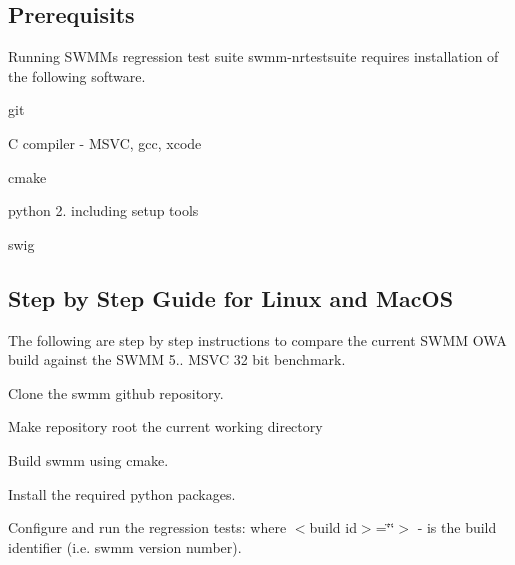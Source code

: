 \subsection*{Prerequisits}

Running S\+W\+MM\textquotesingle{}s regression test suite {\ttfamily swmm-\/nrtestsuite} requires installation of the following software.
\begin{DoxyItemize}
\item git
\item C compiler -\/ M\+S\+VC, gcc, xcode
\item cmake
\item python 2. including setup tools
\item swig
\end{DoxyItemize}

\subsection*{Step by Step Guide for Linux and Mac\+OS}

The following are step by step instructions to compare the current S\+W\+MM O\+WA build against the S\+W\+MM 5.. M\+S\+VC 32 bit benchmark.


\begin{DoxyEnumerate}
\item Clone the swmm github repository. 
\begin{DoxyCode}{0}
\end{DoxyCode}

\item Make repository root the current working directory 
\begin{DoxyCode}{0}
\end{DoxyCode}

\item Build swmm using cmake. 
\begin{DoxyCode}{0}
\end{DoxyCode}

\item Install the required python packages. 
\begin{DoxyCode}{0}
\end{DoxyCode}

\item Configure and run the regression tests\+: where $<$build id$>$=\char`\"{}\char`\"{}$>$ -\/ is the build identifier (i.\+e. swmm version number). 
\begin{DoxyCode}{0}
\end{DoxyCode}

\end{DoxyEnumerate}


